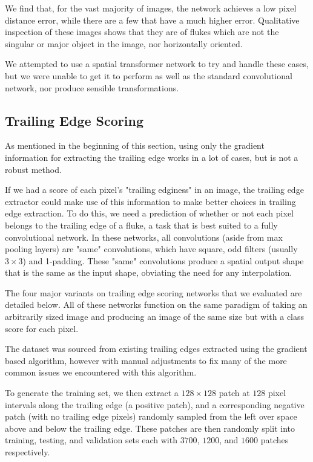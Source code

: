 We find that, for the vast majority of images, the network achieves a low pixel distance error, while there are a few that have a much higher error.
Qualitative inspection of these images shows that they are of flukes which are not the singular or major object in the image, nor horizontally oriented.

We attempted to use a spatial transformer network\cite{jaderberg2015spatial} to try and handle these cases, but we were unable to get it to perform as well as the standard convolutional network, nor produce sensible transformations.

\subsection{Trailing Edge Scoring}

As mentioned in the beginning of this section, using only the gradient information for extracting the trailing edge works in a lot of cases, but is not a robust method.

If we had a score of each pixel's "trailing edginess" in an image, the trailing edge extractor could make use of this information to make better choices in trailing edge extraction.
To do this, we need a prediction of whether or not each pixel belongs to the trailing edge of a fluke, a task that is best suited to a fully convolutional network.
In these networks, all convolutions (aside from max pooling layers) are "same" convolutions, which have square, odd filters (usually $3 \times 3$) and 1-padding.
These "same" convolutions produce a spatial output shape that is the same as the input shape, obviating the need for any interpolation.

The four major variants on trailing edge scoring networks that we evaluated are detailed below.
All of these networks function on the same paradigm of taking an arbitrarily sized image and producing an image of the same size but with a class score for each pixel.

The dataset was sourced from existing trailing edges extracted using the gradient based algorithm, however with manual adjustments to fix many of the more common issues we encountered with this algorithm.

To generate the training set, we then extract a $128 \times 128$ patch at $128$ pixel intervals along the trailing edge (a positive patch), and a corresponding negative patch (with no trailing edge pixels) randomly sampled from the left over space above and below the trailing edge.
These patches are then randomly split into training, testing, and validation sets each with $3700$, $1200$, and $1600$ patches respectively.

